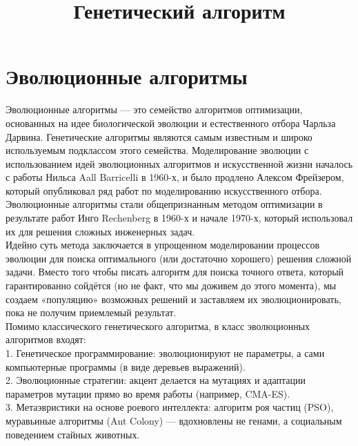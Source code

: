 
\usepackage[most]{tcolorbox}
\setlength{\parindent}{0pt}
\setlength{\parskip}{6pt}


\title{Генетический алгоритм}
\maketitle
\section{Эволюционные алгоритмы}
Эволюционные алгоритмы — это семейство алгоритмов оптимизации, основанных на идее биологической эволюции и естественного отбора Чарльза Дарвина. Генетические алгоритмы являются самым известным и широко используемым подклассом этого семейства. Моделирование эволюции с использованием идей эволюционных алгоритмов и искусственной жизни началось с работы Нильса Aall Barricelli в 1960-х, и было продлено Алексом Фрейзером, который опубликовал ряд работ по моделированию искусственного отбора. Эволюционные алгоритмы стали общепризнанным методом оптимизации в результате работ Инго Rechenberg в 1960-х и начале 1970-х, который использовал их для решения сложных инженерных задач. \\
Идейно суть метода заключается в упрощенном моделировании процессов эволюции для поиска оптимального (или достаточно хорошего) решения сложной задачи. Вместо того чтобы писать алгоритм для поиска точного ответа, который гарантированно сойдётся (но не факт, что мы доживем до этого момента), мы создаем «популяцию» возможных решений и заставляем их эволюционировать, пока не получим приемлемый результат. \\
Помимо классического генетического алгоритма, в класс эволюционных алгоритмов входят: \\
1. Генетическое программирование: эволюционируют не параметры, а сами компьютерные программы (в виде деревьев выражений). \\
2. Эволюционные стратегии: акцент делается на мутациях и адаптации параметров мутации прямо во время работы (например, CMA-ES). \\
3. Метаэвристики на основе роевого интеллекта: алгоритм роя частиц (PSO), муравьиные алгоритмы (Ant Colony) — вдохновлены не генами, а социальным поведением стайных животных. \\

